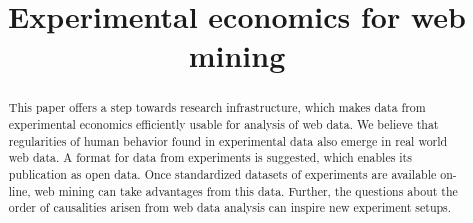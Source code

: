 \documentclass[conference]{IEEEtran}
\begin{document}
\title{Experimental economics for web mining}


\author{
\and
{}
\and
{}
}

\maketitle

\begin{abstract}
This paper offers a step towards research infrastructure, which makes data from experimental economics efficiently usable for analysis of web data. We believe that regularities of human behavior found in experimental data also emerge in real world web data. A format for data from experiments is suggested, which enables its publication as open data. Once standardized datasets of experiments are available on-line, web mining can take advantages from this data. Further, the questions about the order of causalities arisen from web data analysis can inspire new experiment setups. 
\end{abstract}


\IEEEpeerreviewmaketitle
\end{document}
